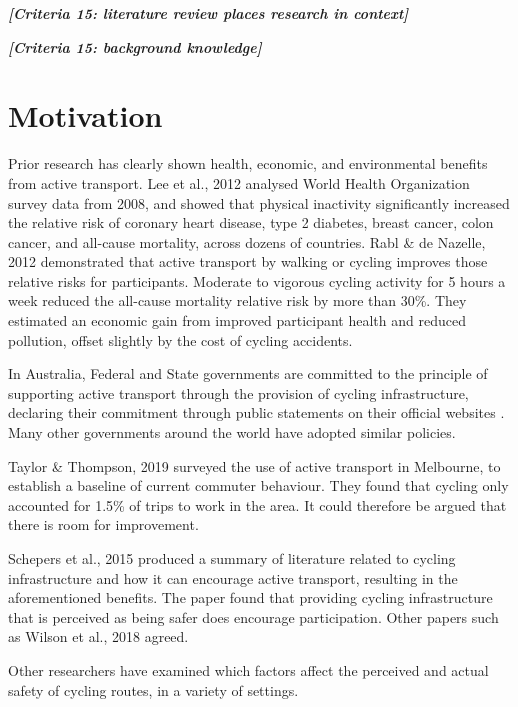 \documentclass[11pt,twoside]{report}
\newcommand{\remark}[1]{{\bf \em [\marginpar{$\Leftarrow$}#1]}}
\begin{document}
\remark{Criteria 15: literature review places research in context}

\remark{Criteria 15: background knowledge}

\section{Motivation}

Prior research has clearly shown health, economic, and environmental benefits from active transport.  Lee et al., 2012 \cite{LEE2012219} analysed World Health Organization survey data from 2008, and showed that physical inactivity significantly increased the relative risk of coronary heart disease, type 2 diabetes, breast cancer, colon cancer, and all-cause mortality, across dozens of countries.  Rabl \& de Nazelle, 2012 \cite{RABL2012121} demonstrated that active transport by walking or cycling improves those relative risks for participants.  Moderate to vigorous cycling activity for 5 hours a week reduced the all-cause mortality relative risk by more than 30\%.  They estimated an economic gain from improved participant health and reduced pollution, offset slightly by the cost of cycling accidents.

In Australia, Federal and State governments are committed to the principle of supporting active transport through the provision of cycling infrastructure, declaring their commitment through public statements on their official websites \cite{federal_policy_2019} \cite{state_policy_2020}.  Many other governments around the world have adopted similar policies.

Taylor \& Thompson, 2019 \cite{melbactive} surveyed the use of active transport in Melbourne, to establish a baseline of current commuter behaviour.  They found that cycling only accounted for 1.5\% of trips to work in the area.  It could therefore be argued that there is room for improvement.

Schepers et al., 2015 \cite{SCHEPERS2015460} produced a summary of literature related to cycling infrastructure and how it can encourage active transport, resulting in the aforementioned benefits.  The paper found that providing cycling infrastructure that is perceived as being safer does encourage participation.  Other papers such as Wilson et al., 2018 \cite{WILSON2018234} agreed.

Other researchers have examined which factors affect the perceived and actual safety of cycling routes, in a variety of settings.
\end{document}
